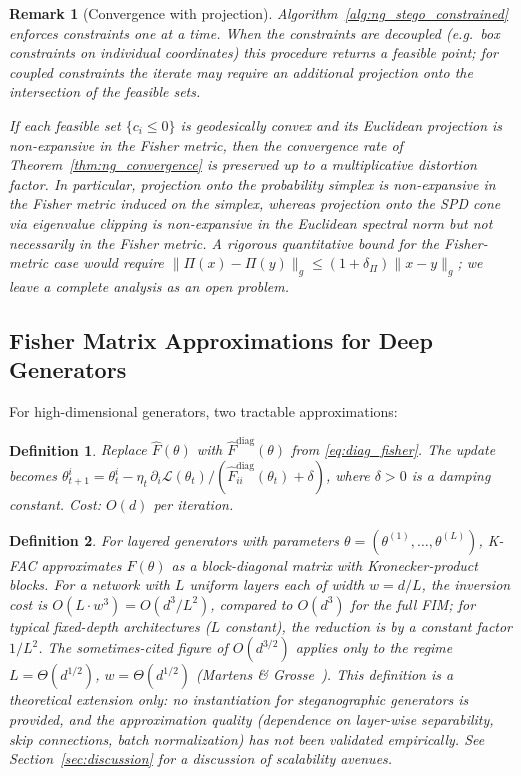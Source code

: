 \documentclass[a4paper,fleqn]{cas-dc}
\newtheorem{definition}{Definition}
\newtheorem{remark}{Remark}
\begin{document}
\begin{remark}[Convergence with projection]
  Algorithm~\ref{alg:ng_stego_constrained} enforces constraints one at a
  time.  When the constraints are decoupled (e.g.\ box constraints on
  individual coordinates) this procedure returns a feasible point; for
  coupled constraints the iterate may require an additional projection
  onto the intersection of the feasible sets.

  If each feasible set $\{c_i \leq 0\}$ is geodesically convex and its
  Euclidean projection is non-expansive in the Fisher metric, then the
  convergence rate of Theorem~\ref{thm:ng_convergence} is preserved up to
  a multiplicative distortion factor.  In particular, projection onto
  the probability simplex is non-expansive in the Fisher metric induced
  on the simplex, whereas projection onto the SPD cone via eigenvalue
  clipping is non-expansive in the Euclidean spectral norm but not
  necessarily in the Fisher metric.  A rigorous quantitative bound for
  the Fisher-metric case would require
  $\|\Pi(x)-\Pi(y)\|_g \leq (1+\delta_\Pi)\|x-y\|_g$; we leave a complete
  analysis as an open problem.
\end{remark}

\subsection{Fisher Matrix Approximations for Deep Generators}

For high-dimensional generators, two tractable approximations:

\begin{definition}%
  \label{def:diagonal_ng}
  Replace $\hat F(\theta)$ with $\hat F^{\mathrm{diag}}(\theta)$ from
  \eqref{eq:diag_fisher}.  The update becomes
  $\theta_{t+1}^i = \theta_t^i - \eta_t\,\partial_i\mathcal{L}(\theta_t) /
  (\hat F^{\mathrm{diag}}_{ii}(\theta_t) + \delta)$,
  where $\delta>0$ is a damping constant.  Cost: $O(d)$ per iteration.
\end{definition}

\begin{definition}%
  \label{def:kfac_ng}
  For layered generators with parameters $\theta = (\theta^{(1)},\ldots,\theta^{(L)})$,
  K-FAC approximates $F(\theta)$ as a block-diagonal matrix with
  Kronecker-product blocks.  For a network with $L$ uniform layers each
  of width $w = d/L$, the inversion cost is $O(L\cdot w^3) = O(d^3/L^2)$,
  compared to $O(d^3)$ for the full FIM; for typical fixed-depth
  architectures ($L$ constant), the reduction is by a constant factor
  $1/L^2$.  The sometimes-cited figure of $O(d^{3/2})$ applies only
  to the regime $L = \Theta(d^{1/2})$, $w = \Theta(d^{1/2})$
  (Martens \& Grosse~\cite{martens2015optimizing}).
  \emph{This definition is a theoretical extension only:}
  no instantiation for steganographic generators is provided, and the
  approximation quality (dependence on layer-wise separability, skip
  connections, batch normalization) has not been validated empirically.
  See Section~\ref{sec:discussion} for a discussion of scalability
  avenues.
\end{definition}
\end{document}
